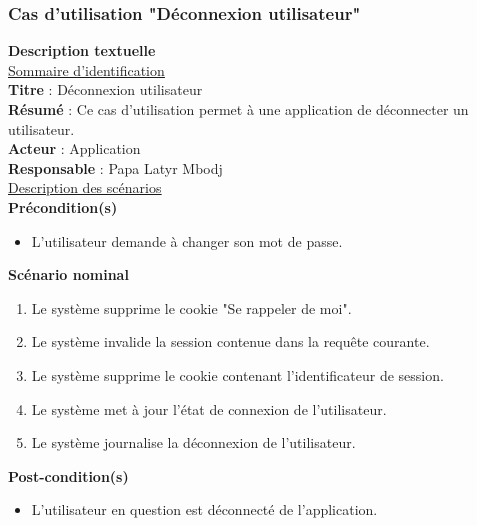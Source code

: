 \subsubsection{Cas d'utilisation "Déconnexion utilisateur"}
\textbf{\RIGHTarrow Description textuelle}\\
\underline{\underline{Sommaire d’identification}} \\
\textbf{Titre} : Déconnexion utilisateur\\
\textbf{Résumé} : Ce cas d’utilisation permet à une application de déconnecter un utilisateur.\\
\textbf{Acteur} : Application\\	
\textbf{Responsable} : Papa Latyr Mbodj\\
\underline{\underline{Description des scénarios}}\\
\textbf{Précondition(s)}
\begin{itemize}
	\item L'utilisateur demande à changer son mot de passe.
\end{itemize}
\textbf{Scénario nominal}
\begin{enumerate}
	\item Le système supprime le cookie "Se rappeler de moi".
	\item Le système invalide la session contenue dans la requête courante.
	\item Le système supprime le cookie contenant l'identificateur de session.
	\item Le système met à jour l'état de connexion de l'utilisateur.
	\item Le système journalise la déconnexion de l'utilisateur.
\end{enumerate}
\textbf{Post-condition(s)}
\begin{itemize}
	\item L’utilisateur en question est déconnecté de l'application.
\end{itemize}


